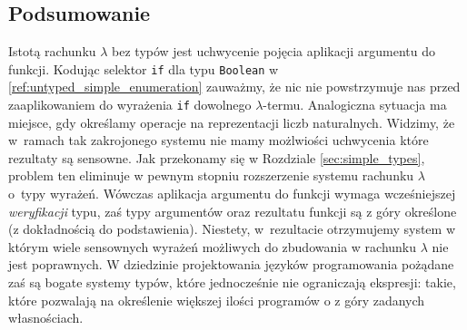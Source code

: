 \subsection{Podsumowanie}
Istotą rachunku \(\lambda\) bez typów jest uchwycenie pojęcia aplikacji argumentu do funkcji. Kodując selektor \texttt{if} dla typu \texttt{Boolean} w \ref{ref:untyped_simple_enumeration} zauważmy, że nic nie powstrzymuje nas przed zaaplikowaniem do wyrażenia \texttt{if} dowolnego \(\lambda\)-termu. Analogiczna sytuacja ma miejsce, gdy określamy operacje na reprezentacji liczb naturalnych. Widzimy, że w~ramach tak zakrojonego systemu nie mamy możlwiości uchwycenia które rezultaty są sensowne. Jak przekonamy się w Rozdziale \ref{sec:simple_types}, problem ten eliminuje w pewnym stopniu rozszerzenie systemu rachunku \(\lambda\) o~typy wyrażeń. Wówczas aplikacja argumentu do funkcji wymaga wcześniejszej \emph{weryfikacji} typu, zaś typy argumentów oraz rezultatu funkcji są z góry określone (z dokładnością do podstawienia). Niestety, w~rezultacie otrzymujemy system w którym wiele sensownych wyrażeń możliwych do zbudowania w rachunku \(\lambda\) nie jest poprawnych. W dziedzinie projektowania języków programowania pożądane zaś są bogate systemy typów, które jednocześnie nie ograniczają ekspresji: takie, które pozwalają na określenie większej ilości programów o z góry zadanych własnościach.
